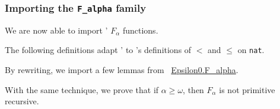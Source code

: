\subsubsection{Importing the \texttt{F\_alpha} family}

We are now able to import \HydrasLib' $F_\alpha$ functions.






The following definitions adapt \HydrasLib' to \ssreflect's 
definitions of $<$ and $\leq$ on \texttt{nat}.


By rewriting, we import a few lemmas from
~\href{../theories/html/hydras.Epsilon0.F_alpha.html}{Epsilon0.F\_alpha}.




With the same technique, we prove that if
$\alpha\geq\omega$, then $F_\alpha$ is not primitive recursive.













